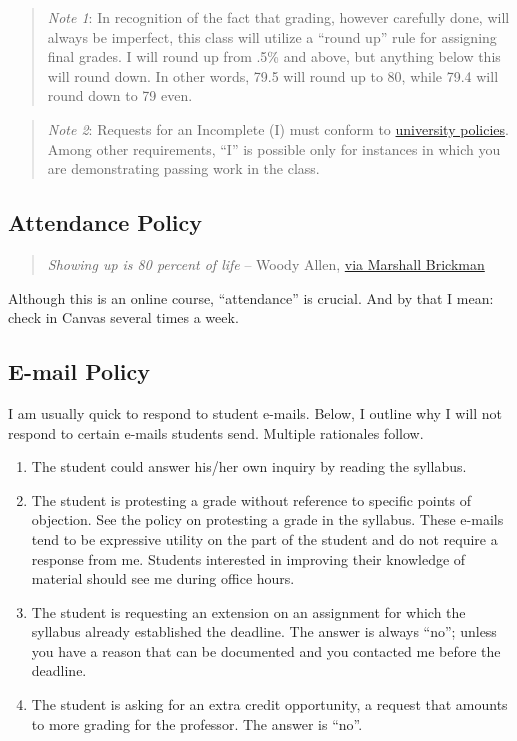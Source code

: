 \documentclass[11pt,]{article}
\providecommand{\tightlist}{%
  \setlength{\itemsep}{0pt}\setlength{\parskip}{0pt}}
\begin{document}
\begin{quote}
\emph{Note 1}: In recognition of the fact that grading, however
carefully done, will always be imperfect, this class will utilize a
``round up'' rule for assigning final grades. I will round up from .5\%
and above, but anything below this will round down. In other words, 79.5
will round up to 80, while 79.4 will round down to 79 even.
\end{quote}

\begin{quote}
\emph{Note 2}: Requests for an Incomplete (I) must conform to
\href{https://bit.ly/3bDxwZi}{university policies}. Among other
requirements, ``I'' is possible only for instances in which you are
demonstrating passing work in the class.
\end{quote}

\hypertarget{attendance-policy}{%
\subsection{Attendance Policy}\label{attendance-policy}}

\begin{quote}
\emph{Showing up is 80 percent of life} -- Woody Allen,
\href{http://quoteinvestigator.com/2013/06/10/showing-up/\#note-6553-1}{via
Marshall Brickman}
\end{quote}

Although this is an online course, ``attendance'' is crucial. And by
that I mean: check in Canvas several times a week.

\hypertarget{e-mail-policy}{%
\subsection{E-mail Policy}\label{e-mail-policy}}

I am usually quick to respond to student e-mails. Below, I outline why I
will not respond to certain e-mails students send. Multiple rationales
follow.

\begin{enumerate}
\def\labelenumi{\arabic{enumi}.}
\tightlist
\item
  The student could answer his/her own inquiry by reading the syllabus.
\item
  The student is protesting a grade without reference to specific points
  of objection. See the policy on protesting a grade in the syllabus.
  These e-mails tend to be expressive utility on the part of the student
  and do not require a response from me. Students interested in
  improving their knowledge of material should see me during office
  hours.
\item
  The student is requesting an extension on an assignment for which the
  syllabus already established the deadline. The answer is always
  ``no''; unless you have a reason that can be documented and you
  contacted me before the deadline.
\item
  The student is asking for an extra credit opportunity, a request that
  amounts to more grading for the professor. The answer is ``no''.
\end{enumerate}
\end{document}
